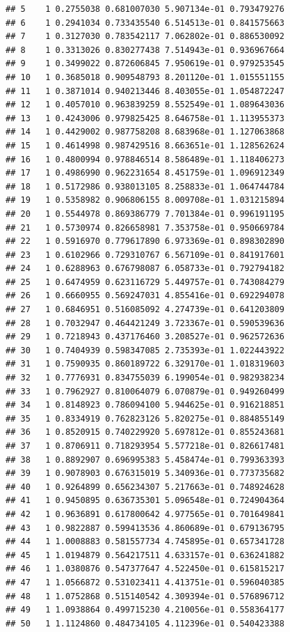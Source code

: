 \documentclass[article]{jss}\usepackage[]{graphicx}\usepackage[]{xcolor}
\makeatletter
\newenvironment{kframe}{%
 \def\at@end@of@kframe{}%
 \ifinner\ifhmode%
  \def\at@end@of@kframe{\end{minipage}}%
  \begin{minipage}{\columnwidth}%
 \fi\fi%
 \def\FrameCommand##1{\hskip\@totalleftmargin \hskip-\fboxsep
 \colorbox{shadecolor}{##1}\hskip-\fboxsep
     \hskip-\linewidth \hskip-\@totalleftmargin \hskip\columnwidth}%
 \MakeFramed {\advance\hsize-\width
   \@totalleftmargin\z@ \linewidth\hsize
   \@setminipage}}%
 {\par\unskip\endMakeFramed%
 \at@end@of@kframe}
\newenvironment{knitrout}{}{} %
\makeatother
\begin{document}
\begin{knitrout}
\begin{kframe}
\begin{verbatim}
## 5    1 0.2755038 0.681007030 5.907134e-01 0.793479276
## 6    1 0.2941034 0.733435540 6.514513e-01 0.841575663
## 7    1 0.3127030 0.783542117 7.062802e-01 0.886530092
## 8    1 0.3313026 0.830277438 7.514943e-01 0.936967664
## 9    1 0.3499022 0.872606845 7.950619e-01 0.979253545
## 10   1 0.3685018 0.909548793 8.201120e-01 1.015551155
## 11   1 0.3871014 0.940213446 8.403055e-01 1.054872247
## 12   1 0.4057010 0.963839259 8.552549e-01 1.089643036
## 13   1 0.4243006 0.979825425 8.646758e-01 1.113955373
## 14   1 0.4429002 0.987758208 8.683968e-01 1.127063868
## 15   1 0.4614998 0.987429516 8.663651e-01 1.128562624
## 16   1 0.4800994 0.978846514 8.586489e-01 1.118406273
## 17   1 0.4986990 0.962231654 8.451759e-01 1.096912349
## 18   1 0.5172986 0.938013105 8.258833e-01 1.064744784
## 19   1 0.5358982 0.906806155 8.009708e-01 1.031215894
## 20   1 0.5544978 0.869386779 7.701384e-01 0.996191195
## 21   1 0.5730974 0.826658981 7.353758e-01 0.950669784
## 22   1 0.5916970 0.779617890 6.973369e-01 0.898302890
## 23   1 0.6102966 0.729310767 6.567109e-01 0.841917601
## 24   1 0.6288963 0.676798087 6.058733e-01 0.792794182
## 25   1 0.6474959 0.623116729 5.449757e-01 0.743084279
## 26   1 0.6660955 0.569247031 4.855416e-01 0.692294078
## 27   1 0.6846951 0.516085092 4.274739e-01 0.641203809
## 28   1 0.7032947 0.464421249 3.723367e-01 0.590539636
## 29   1 0.7218943 0.437176460 3.208527e-01 0.962572636
## 30   1 0.7404939 0.598347085 2.735393e-01 1.022443922
## 31   1 0.7590935 0.860189722 6.329170e-01 1.018319603
## 32   1 0.7776931 0.834755039 6.199054e-01 0.982938234
## 33   1 0.7962927 0.810064079 6.070879e-01 0.949260499
## 34   1 0.8148923 0.786094100 5.944625e-01 0.916218851
## 35   1 0.8334919 0.762823126 5.820275e-01 0.884855149
## 36   1 0.8520915 0.740229920 5.697812e-01 0.855243681
## 37   1 0.8706911 0.718293954 5.577218e-01 0.826617481
## 38   1 0.8892907 0.696995383 5.458474e-01 0.799363393
## 39   1 0.9078903 0.676315019 5.340936e-01 0.773735682
## 40   1 0.9264899 0.656234307 5.217663e-01 0.748924628
## 41   1 0.9450895 0.636735301 5.096548e-01 0.724904364
## 42   1 0.9636891 0.617800642 4.977565e-01 0.701649841
## 43   1 0.9822887 0.599413536 4.860689e-01 0.679136795
## 44   1 1.0008883 0.581557734 4.745895e-01 0.657341728
## 45   1 1.0194879 0.564217511 4.633157e-01 0.636241882
## 46   1 1.0380876 0.547377647 4.522450e-01 0.615815217
## 47   1 1.0566872 0.531023411 4.413751e-01 0.596040385
## 48   1 1.0752868 0.515140542 4.309394e-01 0.576896712
## 49   1 1.0938864 0.499715230 4.210056e-01 0.558364177
## 50   1 1.1124860 0.484734105 4.112396e-01 0.540423388

\end{verbatim}
\end{kframe}
\end{knitrout}
\end{document}
